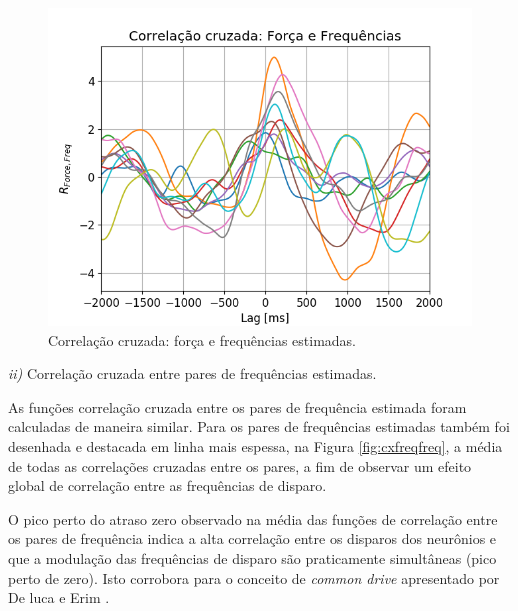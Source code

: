 \documentclass[12pt,letterpaper]{article}
\begin{document}
\begin{enumerate}[label=(\alph*)]
        \begin{figure}[H]
            \centering
            \includegraphics[width=15cm]{TC2/images/corr_force-freqs.png}
            \caption{Correlação cruzada: força e frequências estimadas.}
            \label{fig:xcforcafreq}
        \end{figure}
    
    {\it ii)} Correlação cruzada entre pares de frequências estimadas.
    
    As funções correlação cruzada entre os pares de frequência estimada foram calculadas de maneira similar. Para os pares de frequências estimadas também foi desenhada e destacada em linha mais espessa, na Figura \ref{fig:cxfreqfreq}, a média de todas as correlações cruzadas entre os pares, a fim de observar um efeito global de correlação entre as frequências de disparo.
    
    O pico perto do atraso zero observado na média das funções de correlação entre os pares de frequência indica a alta correlação entre os disparos dos neurônios e que a modulação das frequências de disparo são praticamente simultâneas (pico perto de zero). Isto corrobora para o conceito de {\it common drive} apresentado por De luca e Erim \cite{DeLuca1994}.
        

\end{enumerate}
\end{document}

